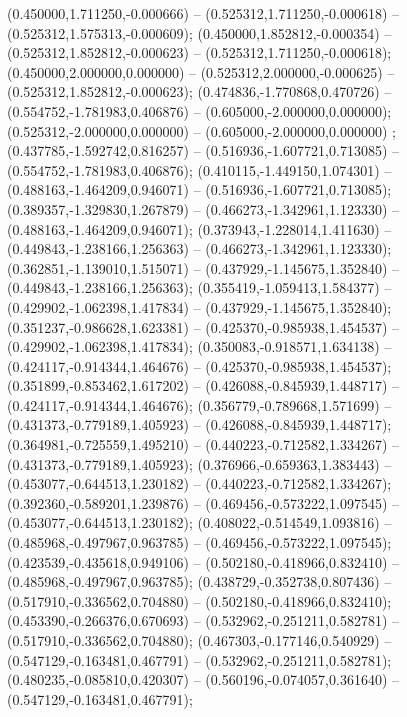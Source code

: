  (0.450000,1.711250,-0.000666) -- (0.525312,1.711250,-0.000618) -- (0.525312,1.575313,-0.000609);
 (0.450000,1.852812,-0.000354) -- (0.525312,1.852812,-0.000623) -- (0.525312,1.711250,-0.000618);
 (0.450000,2.000000,0.000000) -- (0.525312,2.000000,-0.000625) -- (0.525312,1.852812,-0.000623);
 (0.474836,-1.770868,0.470726) -- (0.554752,-1.781983,0.406876) -- (0.605000,-2.000000,0.000000);
 (0.525312,-2.000000,0.000000) -- (0.605000,-2.000000,0.000000) ;
 (0.437785,-1.592742,0.816257) -- (0.516936,-1.607721,0.713085) -- (0.554752,-1.781983,0.406876);
 (0.410115,-1.449150,1.074301) -- (0.488163,-1.464209,0.946071) -- (0.516936,-1.607721,0.713085);
 (0.389357,-1.329830,1.267879) -- (0.466273,-1.342961,1.123330) -- (0.488163,-1.464209,0.946071);
 (0.373943,-1.228014,1.411630) -- (0.449843,-1.238166,1.256363) -- (0.466273,-1.342961,1.123330);
 (0.362851,-1.139010,1.515071) -- (0.437929,-1.145675,1.352840) -- (0.449843,-1.238166,1.256363);
 (0.355419,-1.059413,1.584377) -- (0.429902,-1.062398,1.417834) -- (0.437929,-1.145675,1.352840);
 (0.351237,-0.986628,1.623381) -- (0.425370,-0.985938,1.454537) -- (0.429902,-1.062398,1.417834);
 (0.350083,-0.918571,1.634138) -- (0.424117,-0.914344,1.464676) -- (0.425370,-0.985938,1.454537);
 (0.351899,-0.853462,1.617202) -- (0.426088,-0.845939,1.448717) -- (0.424117,-0.914344,1.464676);
 (0.356779,-0.789668,1.571699) -- (0.431373,-0.779189,1.405923) -- (0.426088,-0.845939,1.448717);
 (0.364981,-0.725559,1.495210) -- (0.440223,-0.712582,1.334267) -- (0.431373,-0.779189,1.405923);
 (0.376966,-0.659363,1.383443) -- (0.453077,-0.644513,1.230182) -- (0.440223,-0.712582,1.334267);
 (0.392360,-0.589201,1.239876) -- (0.469456,-0.573222,1.097545) -- (0.453077,-0.644513,1.230182);
 (0.408022,-0.514549,1.093816) -- (0.485968,-0.497967,0.963785) -- (0.469456,-0.573222,1.097545);
 (0.423539,-0.435618,0.949106) -- (0.502180,-0.418966,0.832410) -- (0.485968,-0.497967,0.963785);
 (0.438729,-0.352738,0.807436) -- (0.517910,-0.336562,0.704880) -- (0.502180,-0.418966,0.832410);
 (0.453390,-0.266376,0.670693) -- (0.532962,-0.251211,0.582781) -- (0.517910,-0.336562,0.704880);
 (0.467303,-0.177146,0.540929) -- (0.547129,-0.163481,0.467791) -- (0.532962,-0.251211,0.582781);
 (0.480235,-0.085810,0.420307) -- (0.560196,-0.074057,0.361640) -- (0.547129,-0.163481,0.467791);
